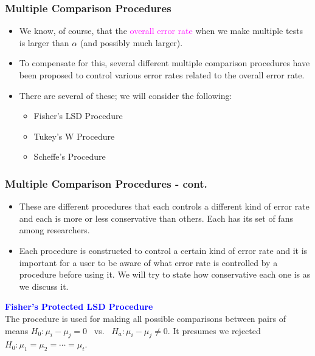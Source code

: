 \documentclass[xcolor=dvipsnames,12pt]{beamer}
\begin{document}
\begin{frame}
\frametitle{Multiple Comparison Procedures}
\begin{itemize} 
\item We know, of course, that the
{\textcolor{magenta}{overall error rate}} when we make multiple tests is
larger than $\alpha$ (and possibly much larger). \\[.1in]
\item To compensate
for this, several different multiple comparison procedures
have been proposed to control various error rates related to
the overall error rate. \\[.1in] 
\item There are several of these; we will consider the 
following:\\[.2in]
\begin{itemize}
\item Fisher's LSD Procedure\\[.1in]
\item Tukey's W Procedure\\[.1in]
\item Scheffe's Procedure
\end{itemize}
\end{itemize}
\end{frame}


\begin{frame}
\frametitle{Multiple Comparison Procedures - cont.}
\begin{itemize} 
\item These are different procedures that each controls a different
kind of error rate and each is more or less conservative than others.  
Each has its set of fans among researchers.\\[.1in]
\item Each procedure is constructed to control a certain kind of
error rate and it is important for a user to be aware of what error
rate is controlled by a procedure before using it.  We will try to 
state how conservative each one is as we discuss it.
\end{itemize}

\noindent \textbf{\textcolor{blue}{Fisher's Protected LSD Procedure}}\\[.1in]
 The procedure is used for making all possible comparisons between
pairs of means $H_0: \mu_i - \mu_j = 0$ \ vs. \ $H_a: \mu_i - \mu_j
\neq 0$.  It presumes we rejected $H_0: \mu_1 = \mu_2 = \cdots =
\mu_t$.\\[.1in]
\end{frame}
\end{document}
